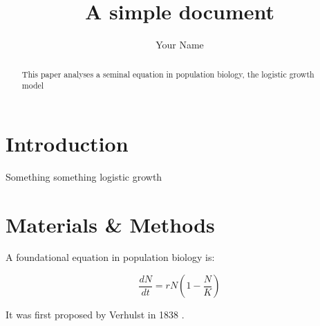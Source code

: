 \documentclass[12pt]{article}
\title{A simple document}
\author{Your Name}
\date{}
\begin{document}
    \maketitle

    \begin{abstract}
        This paper analyses a seminal equation in population biology, the logistic growth model
    \end{abstract}

    \section{Introduction}
        Something something logistic growth 
    
    \section{Materials \& Methods}

    A foundational equation in population biology is:

    \begin{equation}
        \frac{dN}{dt} = r N (1-\frac{N}{K})
    \end{equation}

    It was first proposed by Verhulst in 1838 \cite{verhulst1838notice}.

    

    
\end{document}
